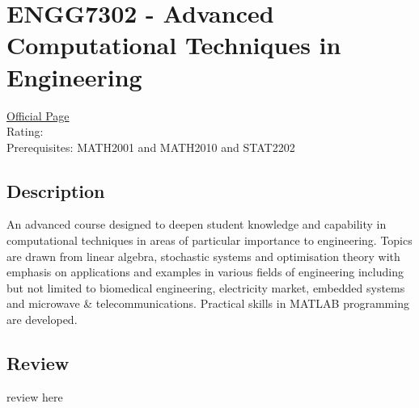 \hypertarget{ENGG7302}{\section{ENGG7302 - Advanced Computational Techniques in Engineering}}

\large
\textcolor{turbo_purple}{\href{https://my.uq.edu.au/programs-courses/course.html?course_code=ENGG7302}{Official Page}} \\
Rating: \cstar\cstar\cstar\cstar\ostar \\
Prerequisites: MATH2001 and MATH2010 and STAT2202

\normalsize
\subsection*{Description}
An advanced course designed to deepen student knowledge and capability in computational techniques in areas of particular importance to engineering.
Topics are drawn from linear algebra, stochastic systems and optimisation theory with emphasis on applications and examples in various fields of engineering including but not limited to biomedical engineering, electricity market, embedded systems and microwave \& telecommunications.
Practical skills in MATLAB programming are developed.

\subsection*{Review}
review here
